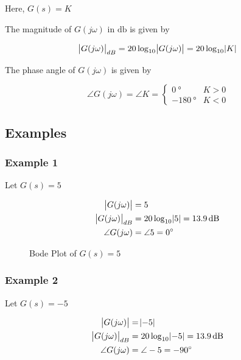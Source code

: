 \documentclass[
  14pt,
  a4paper,
  oneside,
  open=any,
  a4paper,
  14pt]{report}
\begin{document}
Here, \(G(s) = K\)

The magnitude of \(G(j\omega)\) in \(\unit{\decibel}\) is given by

\[
    \abs{G(j\omega)}_{dB} = 20\log_{10}\abs{G(j\omega)} = 20\log_{10}\abs{K} 
\]

The phase angle of \(G(j\omega)\) is given by

\[
    \angle G(j\omega) = \angle K = 
    \begin{cases}
        \SI{0}{\degree} & K > 0 \\
        \SI{-180}{\degree} & K < 0
    \end{cases}
\]

\subsection{Examples}\label{examples-2}

\subsubsection{Example 1}\label{example-1-7}

Let \(G(s)=5\)

\[
\begin{aligned}
    \abs{G(j\omega)} &= 5 \\
    \abs{G(j\omega)}_{dB} &= 20\log_{10}\abs{5} = \SI{13.9}{\decibel} \\
    \angle G(j\omega) &= \angle 5 = \SI{0}{\degree}
\end{aligned}
\]

\begin{figure}

\centering{



}

\caption{\label{fig-bode-plot-constant-1}Bode Plot of \(G(s) = 5\)}

\end{figure}%

\newpage{}

\subsubsection{Example 2}\label{example-2-4}

Let \(G(s) = -5\)

\[
\begin{aligned}
    \abs{G(j\omega)} &= \abs{-5} \\
    \abs{G(j\omega)}_{dB} &= 20\log_{10}\abs{-5} = \SI{13.9}{\decibel} \\
    \angle G(j\omega) &= \angle -5 = \SI{-90}{\degree}
\end{aligned}
\]
\end{document}
